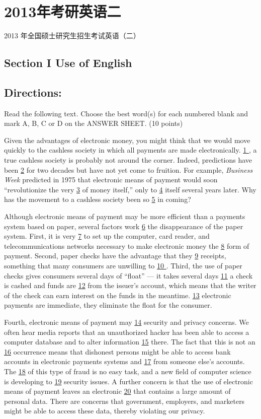 \documentclass[UTF8,11pt]{ctexart}
\begin{document}
\section*{2013年考研英语二}
2013 年全国硕士研究生招生考试英语（二）


\subsection*{\textbf{Section I Use of English}}


\subsection*{\textbf{Directions:}}


Read the following text. Choose the best word(s) for each numbered blank and mark A, B, C or D on the ANSWER SHEET. (10 points)


Given the advantages of electronic money, you might think that we would move quickly to the cashless society in which all payments are made electronically. \uline{1 }, a true cashless society is probably not around the corner. Indeed, predictions have been \uline{2} for two decades but have not yet come to fruition. For example, \textit{Business Week} predicted in 1975 that electronic means of payment would soon “revolutionize the very \uline{3} of money itself,” only to \uline{4} itself several years later. Why has the movement to a cashless society been so \uline{5} in coming?


Although electronic means of payment may be more efficient than a payments system based on paper, several factors work \uline{6} the disappearance of the paper system. First, it is very \uline{7} to set up the computer, card reader, and telecommunications networks necessary to make electronic money the \uline{8} form of payment. Second, paper checks have the advantage that they \uline{9} receipts, something that many consumers are unwilling to \uline{10 }. Third, the use of paper checks gives consumers several days of “float” — it takes several days \uline{11} a check is cashed and funds are \uline{12} from the issuer’s account, which means that the writer of the check can earn interest on the funds in the meantime. \uline{13} electronic payments are immediate, they eliminate the float for the consumer.


Fourth, electronic means of payment may \uline{14} security and privacy concerns. We often hear media reports that an unauthorized hacker has been able to access a computer database and to alter information \uline{15} there. The fact that this is not an \uline{16} occurrence means that dishonest persons might be able to access bank accounts in electronic payments systems and \uline{17} from someone else’s accounts. The \uline{18} of this type of fraud is no easy task, and a new field of computer science is developing to \uline{19} security issues. A further concern is that the use of electronic means of payment leaves an electronic \uline{20} that contains a large amount of personal data. There are concerns that government, employers, and marketers might be able to access these data, thereby violating our privacy.
\end{document}
